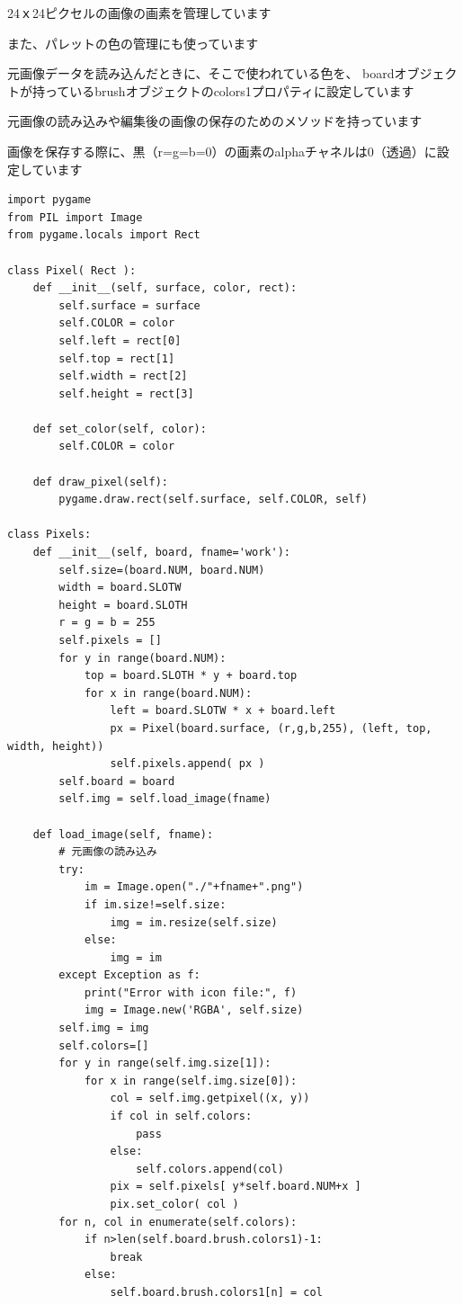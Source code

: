\documentclass[uplatex,a4paper,11pt,oneside,openany]{jsbook}
\begin{document}
24ｘ24ピクセルの画像の画素を管理しています

また、パレットの色の管理にも使っています

元画像データを読み込んだときに、そこで使われている色を、
boardオブジェクトが持っているbrushオブジェクトのcolors1プロパティに設定しています

元画像の読み込みや編集後の画像の保存のためのメソッドを持っています

画像を保存する際に、黒（r=g=b=0）の画素のalphaチャネルは0（透過）に設定しています

\begin{lstlisting}[caption=class Pixels,label=pr06]
import pygame
from PIL import Image
from pygame.locals import Rect

class Pixel( Rect ):
    def __init__(self, surface, color, rect):
        self.surface = surface
        self.COLOR = color
        self.left = rect[0]
        self.top = rect[1]
        self.width = rect[2]
        self.height = rect[3]

    def set_color(self, color):
        self.COLOR = color

    def draw_pixel(self):
        pygame.draw.rect(self.surface, self.COLOR, self)

class Pixels:
    def __init__(self, board, fname='work'):
        self.size=(board.NUM, board.NUM)
        width = board.SLOTW
        height = board.SLOTH
        r = g = b = 255
        self.pixels = []
        for y in range(board.NUM):
            top = board.SLOTH * y + board.top
            for x in range(board.NUM):
                left = board.SLOTW * x + board.left
                px = Pixel(board.surface, (r,g,b,255), (left, top, width, height))
                self.pixels.append( px )
        self.board = board
        self.img = self.load_image(fname)

    def load_image(self, fname):
        # 元画像の読み込み
        try:
            im = Image.open("./"+fname+".png")
            if im.size!=self.size:
                img = im.resize(self.size)
            else:
                img = im
        except Exception as f:
            print("Error with icon file:", f)
            img = Image.new('RGBA', self.size)
        self.img = img
        self.colors=[]
        for y in range(self.img.size[1]):
            for x in range(self.img.size[0]):
                col = self.img.getpixel((x, y))
                if col in self.colors:
                    pass
                else:
                    self.colors.append(col)
                pix = self.pixels[ y*self.board.NUM+x ]
                pix.set_color( col )
        for n, col in enumerate(self.colors):
            if n>len(self.board.brush.colors1)-1:
                break
            else:
                self.board.brush.colors1[n] = col


\end{lstlisting}
\end{document}

